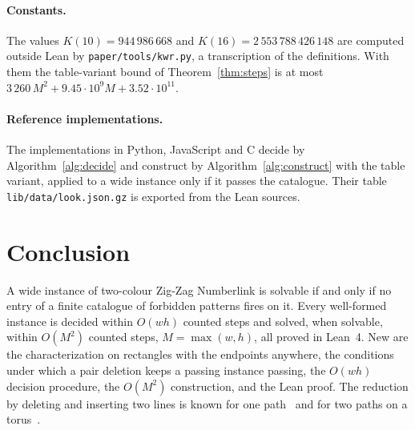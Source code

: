 \documentclass[11pt]{article}
\makeatletter
\newcommand{\lean}[1]{\texttt{#1}}
\newcommand{\secmark}[1]{\pdfsavepos\protected@write\@auxout{}{\string\secpos{#1}{\thepage}{\noexpand\the\noexpand\pdflastypos}}}
\def\secpos#1#2#3{}
\makeatother
\begin{document}
\paragraph{Constants.} The values $K(10)=944\,986\,668$ and $K(16)=2\,553\,788\,426\,148$ are
computed outside Lean by \lean{paper/tools/kwr.py}, a transcription of the definitions. With them
the table-variant bound of Theorem~\ref{thm:steps} is at most
$3\,260\,M^2+9.45\cdot 10^{9}M+3.52\cdot 10^{11}$.

\paragraph{Reference implementations.} The implementations in Python, JavaScript and C decide by
Algorithm~\ref{alg:decide} and construct by Algorithm~\ref{alg:construct} with the table variant,
applied to a wide instance only if it passes the catalogue. Their table
\lean{lib/data/look.json.gz} is exported from the Lean sources.

\secmark{concl}

\section{Conclusion}\label{sec:conclusion}

A wide instance of two-colour Zig-Zag Numberlink is solvable if and only if no entry of a finite
catalogue of forbidden patterns fires on it. Every well-formed instance is decided within $O(wh)$
counted steps and solved, when solvable, within $O(M^2)$ counted steps, $M=\max(w,h)$, all proved in Lean~4. New
are the characterization on rectangles with the endpoints anywhere, the conditions under which a
pair deletion keeps a passing instance passing, the $O(wh)$ decision procedure, the $O(M^2)$
construction, and the Lean proof.
The reduction by deleting and inserting two lines is known for one path~\cite{ips82} and for two
paths on a torus~\cite{makino06}.
\end{document}
